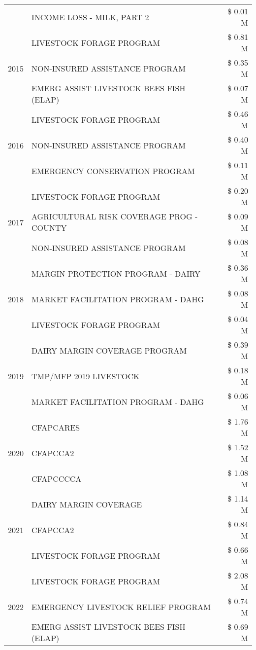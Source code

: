 \begin{tabular}{llr}
 & INCOME LOSS - MILK, PART 2 & \$ 0.01 M \\
\cline{1-3}
\multirow[t]{3}{*}{2015} & LIVESTOCK FORAGE PROGRAM & \$ 0.81 M \\
 & NON-INSURED ASSISTANCE PROGRAM & \$ 0.35 M \\
 & EMERG ASSIST LIVESTOCK BEES FISH (ELAP) & \$ 0.07 M \\
\cline{1-3}
\multirow[t]{3}{*}{2016} & LIVESTOCK FORAGE PROGRAM & \$ 0.46 M \\
 & NON-INSURED ASSISTANCE PROGRAM & \$ 0.40 M \\
 & EMERGENCY CONSERVATION PROGRAM & \$ 0.11 M \\
\cline{1-3}
\multirow[t]{3}{*}{2017} & LIVESTOCK FORAGE PROGRAM & \$ 0.20 M \\
 & AGRICULTURAL RISK COVERAGE PROG - COUNTY & \$ 0.09 M \\
 & NON-INSURED ASSISTANCE PROGRAM & \$ 0.08 M \\
\cline{1-3}
\multirow[t]{3}{*}{2018} & MARGIN PROTECTION PROGRAM - DAIRY & \$ 0.36 M \\
 & MARKET FACILITATION PROGRAM - DAHG & \$ 0.08 M \\
 & LIVESTOCK FORAGE PROGRAM & \$ 0.04 M \\
\cline{1-3}
\multirow[t]{3}{*}{2019} & DAIRY MARGIN COVERAGE PROGRAM & \$ 0.39 M \\
 & TMP/MFP 2019 LIVESTOCK & \$ 0.18 M \\
 & MARKET FACILITATION PROGRAM - DAHG & \$ 0.06 M \\
\cline{1-3}
\multirow[t]{3}{*}{2020} & CFAPCARES & \$ 1.76 M \\
 & CFAPCCA2 & \$ 1.52 M \\
 & CFAPCCCCA & \$ 1.08 M \\
\cline{1-3}
\multirow[t]{3}{*}{2021} & DAIRY MARGIN COVERAGE & \$ 1.14 M \\
 & CFAPCCA2 & \$ 0.84 M \\
 & LIVESTOCK FORAGE PROGRAM & \$ 0.66 M \\
\cline{1-3}
\multirow[t]{3}{*}{2022} & LIVESTOCK FORAGE PROGRAM & \$ 2.08 M \\
 & EMERGENCY LIVESTOCK RELIEF PROGRAM & \$ 0.74 M \\
 & EMERG ASSIST LIVESTOCK BEES FISH (ELAP) & \$ 0.69 M \\
\cline{1-3}
\bottomrule
\end{tabular}
